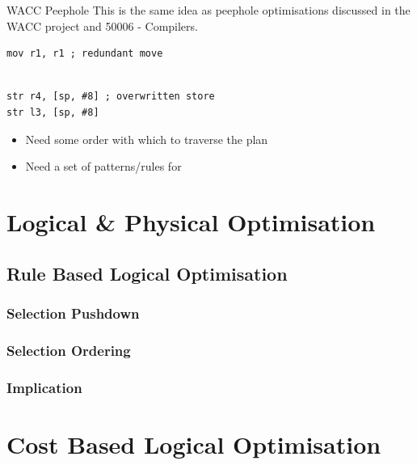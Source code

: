 \begin{sidenotebox}{WACC Peephole}
    This is the same idea as peephole optimisations discussed in the WACC project and 50006 - Compilers.
    \begin{minipage}{.49\textwidth}
        \begin{verbatim}
mov r1, r1 ; redundant move
        
        \end{verbatim}
    \end{minipage} \hfill \begin{minipage}{.49\textwidth}
        \begin{verbatim}
str r4, [sp, #8] ; overwritten store 
str l3, [sp, #8]
        \end{verbatim}
    \end{minipage}
\end{sidenotebox}

\begin{itemize}
    \item Need some order with which to traverse the plan
    \item Need a set of patterns/rules for 
\end{itemize}


\section{Logical \& Physical Optimisation}

\subsection{Rule Based Logical Optimisation}

\subsubsection{Selection Pushdown}

\subsubsection{Selection Ordering}

\subsubsection{Implication}

\section{Cost Based Logical Optimisation}


